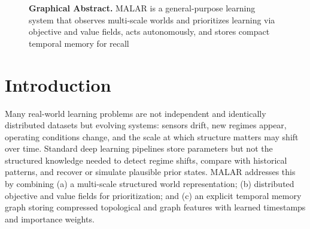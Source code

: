\documentclass[11pt,english]{article}
\theoremstyle{remark}
\begin{document}
\newpage
\begin{figure}[t]
	\centering
	\caption*{\textbf{Graphical Abstract.} MALAR is a general-purpose learning system that observes multi-scale worlds and prioritizes learning via objective and value fields, acts autonomously, and stores compact temporal memory for recall}
\end{figure}


\newpage
\maketitle
\section{Introduction}
Many real-world learning problems are not independent and identically distributed datasets but evolving systems: sensors drift, new regimes appear,
operating conditions change, and the scale at which structure matters may shift over time. Standard deep learning
pipelines store parameters but not the structured knowledge needed to detect regime shifts, compare with historical
patterns, and recover or simulate plausible prior states. MALAR addresses this by combining (a) a multi-scale structured
world representation; (b) distributed objective and value fields for prioritization; and (c) an explicit temporal memory
graph storing compressed topological and graph features with learned timestamps and importance weights.
\end{document}

